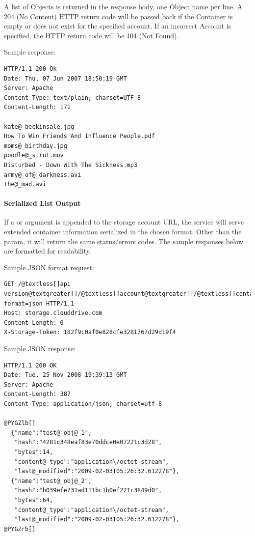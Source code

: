 \documentclass[letterpaper,10pt,english]{manual}
\begin{document}
A list of Objects is returned in the response body, one Object name per
line. A 204 (No Content) HTTP return code will be passed back if the
Container is empty or does not exist for the specified account. If an
incorrect Account is specified, the HTTP return code will be 404
(Not Found).

Sample response:

\begin{Verbatim}[commandchars=@\[\]]
HTTP/1.1 200 Ok
Date: Thu, 07 Jun 2007 18:50:19 GMT
Server: Apache
Content-Type: text/plain; charset=UTF-8
Content-Length: 171

kate@_beckinsale.jpg
How To Win Friends And Influence People.pdf
moms@_birthday.jpg
poodle@_strut.mov
Disturbed - Down With The Sickness.mp3
army@_of@_darkness.avi
the@_mad.avi
\end{Verbatim}


\paragraph{Serialized List Output}

If a  or  argument is appended to the storage
account URL, the service will serve extended container information
serialized in the chosen format.  Other than the 
param, it will return the same status/errors codes.  The sample responses
below are formatted for readability.

Sample JSON format request:

\begin{Verbatim}[commandchars=@\[\]]
GET /@textless[]api version@textgreater[]/@textless[]account@textgreater[]/@textless[]container@textgreater[]?format=json HTTP/1.1
Host: storage.clouddrive.com
Content-Length: 0
X-Storage-Token: 182f9c0af0e828cfe3281767d29d19f4
\end{Verbatim}

Sample JSON response:

\begin{Verbatim}[commandchars=@\[\]]
HTTP/1.1 200 OK
Date: Tue, 25 Nov 2008 19:39:13 GMT
Server: Apache
Content-Length: 387
Content-Type: application/json; charset=utf-8

@PYGZlb[]
  {"name":"test@_obj@_1",
   "hash":"4281c348eaf83e70ddce0e07221c3d28",
   "bytes":14,
   "content@_type":"application\/octet-stream",
   "last@_modified":"2009-02-03T05:26:32.612278"},
  {"name":"test@_obj@_2",
   "hash":"b039efe731ad111bc1b0ef221c3849d0",
   "bytes":64,
   "content@_type":"application\/octet-stream",
   "last@_modified":"2009-02-03T05:26:32.612278"},
@PYGZrb[]
\end{Verbatim}
\end{document}
